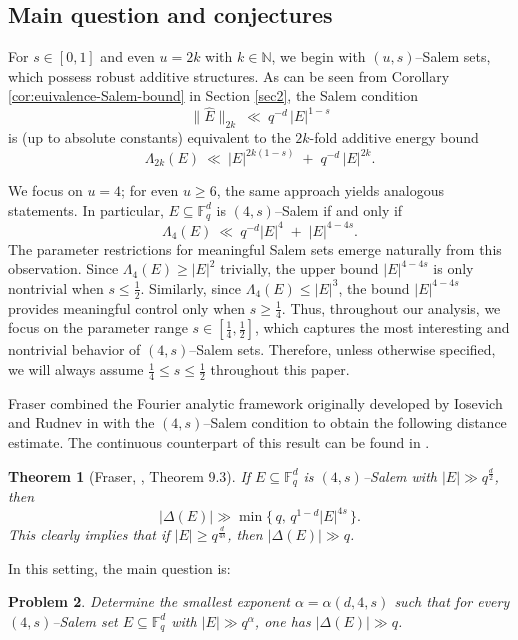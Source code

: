 \documentclass[11pt]{article}
\newtheorem{theorem}{Theorem}
\newtheorem{problem}[theorem]{Problem}
\def\F{\mathbb{F}}
\begin{document}
\subsection{Main question and conjectures}

For \(s\in[0,1]\) and even \(u=2k\) with \(k\in\mathbb N\), we begin with \((u,s)\)–Salem sets, which possess robust additive structures.  As can be seen from Corollary \ref{cor:euivalence-Salem-bound} in Section \ref{sec2},  the Salem condition
\[
\|\widehat{E}\|_{2k}\ \ll \ q^{-d}\,|E|^{1-s}
\]
is (up to absolute constants) equivalent to the \(2k\)-fold additive energy bound
\[
\Lambda_{2k}(E)\ \ll \ |E|^{2k(1-s)}\;+\;q^{-d}\,|E|^{2k}.
\]


We focus on \(u=4\); for even \(u\ge 6\), the same approach yields analogous statements. In particular,  \(E\subseteq\F_q^d\) is \((4,s)\)–Salem if and only if
\begin{equation}\label{eq:energy4}
\Lambda_{4}(E)\ \ll \ q^{-d}|E|^{4}\;+\;|E|^{4-4s}.
\end{equation}
The parameter restrictions for meaningful Salem sets emerge naturally from this observation. Since $\Lambda_4(E) \geq |E|^2$ trivially, the upper bound 
$|E|^{4-4s}$ is only nontrivial when $s \leq \frac{1}{2}$. Similarly, since $\Lambda_4(E) \leq |E|^3$, the bound $|E|^{4-4s}$ provides meaningful control only when $s \geq \frac{1}{4}$. Thus, throughout our analysis, we focus on the parameter range $s \in \left[\frac{1}{4}, \frac{1}{2}\right]$, which captures the most interesting and nontrivial behavior of $(4,s)$--Salem sets. Therefore, unless otherwise specified, we will always assume 
 $\frac{1}{4} \le s \le \frac{1}{2}$  throughout  this paper.


Fraser combined the Fourier analytic framework originally developed by
Iosevich and Rudnev in \cite{IR07} with the \((4,s)\)--Salem condition to
obtain the following distance estimate. The continuous counterpart of this result can be found in
\cite[Theorem 7.3]{JF1}.
\begin{theorem} [Fraser, \cite{fraser2}, Theorem 9.3] \label{Fraser}
If $ E\subseteq \mathbb F_q^d$  is $(4, s)$--Salem with $|E|\gg q^{\frac{d}{2}}$,  then 
\[ |\Delta(E)|\gg \min\{\,q,\, q^{1-d}|E|^{4s}\,\}.\]
This clearly implies that  if   $|E|\ge  q^{\frac{d}{4s}}$, then $|\Delta(E)|\gg q$. \end{theorem}


In this setting, the main question is:
\begin{problem} \label{mainQ}
Determine the smallest exponent \(\alpha=\alpha(d,4,s)\) such that for every \((4,s)\)–Salem set \(E\subseteq\F_q^d\) with \(|E|\gg q^{\alpha}\),  one has \(|\Delta(E)|\gg q\).
\end{problem}
\end{document}
